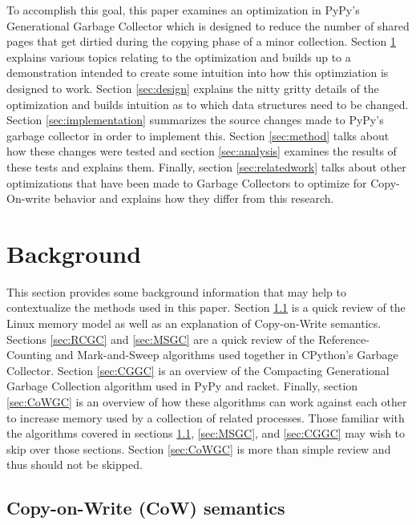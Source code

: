 \documentclass{article}
\begin{document}
To accomplish this goal, this paper examines an optimization in PyPy's Generational Garbage Collector which is designed to reduce the number of shared pages that get dirtied during the copying phase of a minor collection.  Section \ref{sec:background} explains various topics relating to the optimization and builds up to a demonstration intended to create some intuition into how this optimziation is designed to work.  Section \ref{sec:design} explains the nitty gritty details of the optimization and builds intuition as to which data structures need to be changed.  Section \ref{sec:implementation} summarizes the source changes made to PyPy's garbage collector in order to implement this.  Section \ref{sec:method} talks about how these changes were tested and section \ref{sec:analysis} examines the results of these tests and explains them.  Finally, section \ref{sec:relatedwork} talks about other optimizations that have been made to Garbage Collectors to optimize for Copy-On-write behavior and explains how they differ from this research.  

\section{Background}\label{sec:background}

This section provides some background information that may help to contextualize the methods used in this paper.  Section \ref{sec:CoW} is a quick review of the Linux memory model as well as an explanation of Copy-on-Write semantics.  Sections \ref{sec:RCGC} and \ref{sec:MSGC} are a quick review of the Reference-Counting and Mark-and-Sweep algorithms used together in CPython's Garbage Collector.  Section \ref{sec:CGGC} is an overview of the Compacting Generational Garbage Collection algorithm used in PyPy and racket.  Finally, section \ref{sec:CoWGC} is an overview of how these algorithms can work against each other to increase memory used by a collection of related processes.  Those familiar with the algorithms covered in sections \ref{sec:CoW}, \ref{sec:MSGC}, and \ref{sec:CGGC} may wish to skip over those sections.  Section \ref{sec:CoWGC} is more than simple review and thus should not be skipped.  

\subsection{Copy-on-Write (CoW) semantics}\label{sec:CoW}
\end{document}
